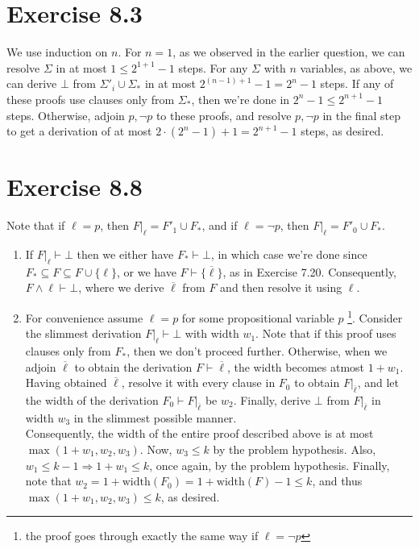 \documentclass{article}
\begin{document}
\section*{Exercise 8.3}
We use induction on $n$. For $n = 1$, as we observed in the earlier question, we can resolve $\Sigma$ in at most $1\leq 2^{1+1}-1$ steps. For any $\Sigma$ with $n$ variables, as above, we can derive $\bot$ from $\Sigma'_i\cup\Sigma_*$ in at most $2^{(n-1)+1}-1 = 2^n - 1$ steps. If any of these proofs use clauses only from $\Sigma_*$, then we're done in $2^{n} - 1\leq 2^{n+1} - 1$ steps. Otherwise, adjoin $p, \lnot p$ to these proofs, and resolve $p, \lnot p$ in the final step to get a derivation of at most $2\cdot (2^n - 1) + 1 = 2^{n+1} - 1$ steps, as desired.
\section*{Exercise 8.8}
Note that if $\ell = p$, then $F|_\ell = F'_1\cup F_*$, and if $\ell = \lnot p$, then $F|_\ell = F'_0\cup F_*$. \\
\begin{enumerate}
    \item If $F|_\ell\vdash\bot$ then we either have $F_*\vdash\bot$, in which case we're done since $F_*\subseteq F\subseteq F\cup\{\ell\}$, or we have $F\vdash\{\overline{\ell}\}$, as in Exercise 7.20. Consequently, $F\wedge\ell\vdash\bot$, where we derive $\overline{\ell}$ from $F$ and then resolve it using $\ell$. 
    \item For convenience assume $\ell = p$ for some propositional variable $p$ \footnote{the proof goes through exactly the same way if $\ell = \lnot p$}. Consider the slimmest derivation $F|_\ell\vdash\bot$ with width $w_1$. Note that if this proof uses clauses only from $F_*$, then we don't proceed further. Otherwise, when we adjoin $\overline{\ell}$ to obtain the derivation $F\vdash\overline{\ell}$, the width becomes atmost $1 + w_1$. Having obtained $\overline{\ell}$, resolve it with every clause in $F_0$ to obtain $F|_{\overline{\ell}}$, and let the width of the derivation $F_0\vdash F|_{\overline{\ell}}$ be $w_2$. Finally, derive $\bot$ from $F|_{\overline{\ell}}$ in width $w_3$ in the slimmest possible manner.\\
    Consequently, the width of the entire proof described above is at most $\max(1 + w_1, w_2, w_3)$. Now, $w_3\leq k$ by the problem hypothesis. Also, $w_1\leq k - 1\Rightarrow 1 + w_1\leq k$, once again, by the problem hypothesis. Finally, note that $w_2 = 1 + \mathrm{width}(F_0) = 1 + \mathrm{width}(F) - 1 \leq k$, and thus $\max(1 + w_1, w_2, w_3)\leq k$, as desired.
\end{enumerate}
\end{document}
